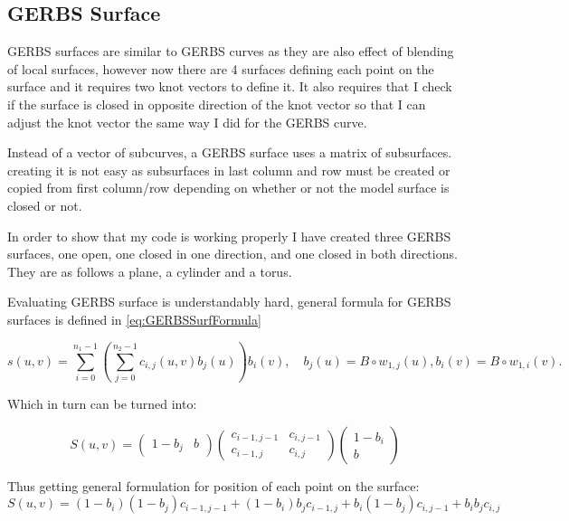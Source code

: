 \documentclass[a4paper,12pt]{extarticle}
\begin{document}
\subsection{GERBS Surface}
GERBS surfaces are similar to GERBS curves as they are also effect of blending of local surfaces, however now there are 4 surfaces defining each point on the surface and it requires two knot vectors to define it. It also requires that I check if the surface is closed in opposite direction of the knot vector so that I can adjust the knot vector the same way I did for the GERBS curve. 

Instead of a vector of subcurves, a GERBS surface uses a matrix of subsurfaces. creating it is not easy as subsurfaces in last column and row must be created or copied from first column/row depending on whether or not the model surface is closed or not.

In order to show that my code is working properly I have created three GERBS surfaces, one open, one closed in one direction, and one closed in both directions. They are as follows a plane, a cylinder and a torus.

Evaluating GERBS surface is understandably hard, general formula for GERBS surfaces is defined in \cref{eq:GERBSSurfFormula}

\begin{equation}
s(u,v)= \sum_{i=0}^{n_1-1} \left( \sum_{j=0}^{n_2-1} c_{i,j}(u,v) b_j(u) \right) b_i(v), \quad b_j(u) = B \circ w_{1,j}(u), b_i(v) = B \circ w_{1,i}(v).
\label{eq:GERBSSurfFormula}
\end{equation}

Which in turn can be turned into:

\begin{equation}
S(u,v)=
\begin{pmatrix}
1-b_j & b
\end{pmatrix}
\begin{pmatrix}
c_{i-1,j-1} & c_{i,j-1}\\
c_{i-1,j} & c_{i,j}
\end{pmatrix}
\begin{pmatrix}
1-b_i \\
b
\end{pmatrix}
\end{equation}

Thus getting general formulation for position of each point on the surface:
\begin{equation}
  S(u,v)= (1-b_i) (1-b_j) c_{i-1,j-1} + (1-b_i) b_j c_{i-1,j} + b_i (1-b_j) c_{i,j-1} + b_i b_j c_{i,j}
  \label{eq:GERBSGeneral}
\end{equation}
\end{document}
